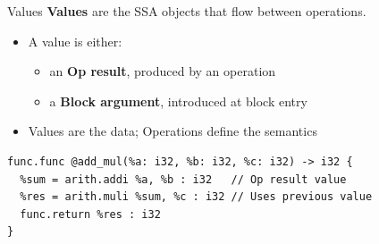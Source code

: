 \begin{frame}[fragile]{Values}
  \textbf{\textcolor{mainAccent}{Values}} are the SSA objects that flow between operations.

  \bigskip
  \begin{itemize}
    \item A value is either:
      \begin{itemize}
        \item an \textbf{Op result}, produced by an operation
        \item a \textbf{Block argument}, introduced at block entry
      \end{itemize}
    \item Values are the data; Operations define the semantics
  \end{itemize}

\begin{lstlisting}[language=none,basicstyle=\ttfamily\small]
func.func @add_mul(%a: i32, %b: i32, %c: i32) -> i32 {
  %sum = arith.addi %a, %b : i32   // Op result value
  %res = arith.muli %sum, %c : i32 // Uses previous value
  func.return %res : i32
}
\end{lstlisting}

\end{frame}


